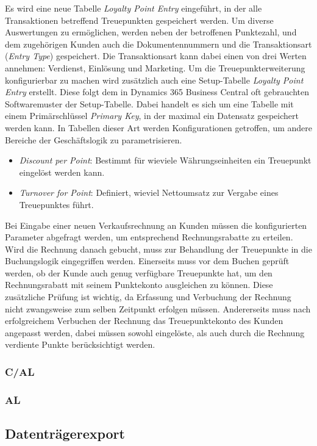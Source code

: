 Es wird eine neue Tabelle \textit{Loyalty Point Entry} eingeführt, in der alle Transaktionen betreffend Treuepunkten gespeichert werden. Um diverse Auswertungen zu ermöglichen, werden neben der betroffenen Punktezahl, und dem zugehörigen Kunden auch die Dokumentennummern und die Transaktionsart (\textit{Entry Type}) gespeichert. Die Transaktionsart kann dabei einen von drei Werten annehmen: Verdienst, Einlösung und Marketing. Um die Treuepunkterweiterung konfigurierbar zu machen wird zusätzlich auch eine Setup-Tabelle \textit{Loyalty Point Entry} erstellt. Diese folgt dem in Dynamics 365 Business Central oft gebrauchten Softwaremuster der Setup-Tabelle. Dabei handelt es sich um eine Tabelle mit einem Primärschlüssel \textit{Primary Key}, in der maximal ein Datensatz gespeichert werden kann. In Tabellen dieser Art werden Konfigurationen getroffen, um andere Bereiche der Geschäftslogik zu parametrisieren.
\begin{itemize}
	\item \textit{Discount per Point}: Bestimmt für wieviele Währungseinheiten ein Treuepunkt eingelöst werden kann.
	\item \textit{Turnover for Point}: Definiert, wieviel Nettoumsatz zur Vergabe eines Treuepunktes führt.
\end{itemize}

Bei Eingabe einer neuen Verkaufsrechnung an Kunden müssen die konfigurierten Parameter abgefragt werden, um entsprechend Rechnungsrabatte zu erteilen. Wird die Rechnung danach gebucht, muss zur Behandlung der Treuepunkte in die Buchungslogik eingegriffen werden. Einerseits muss vor dem Buchen geprüft werden, ob der Kunde auch genug verfügbare Treuepunkte hat, um den Rechnungsrabatt mit seinem Punktekonto ausgleichen zu können. Diese zusätzliche Prüfung ist wichtig, da Erfassung und Verbuchung der Rechnung nicht zwangsweise zum selben Zeitpunkt erfolgen müssen. Andererseits muss nach erfolgreichem Verbuchen der Rechnung das Treuepunktekonto des Kunden angepasst werden, dabei müssen sowohl eingelöste, als auch durch die Rechnung verdiente Punkte berücksichtigt werden.

\subsubsection{C/AL}
\subsubsection{AL}

\subsection{Datenträgerexport}
